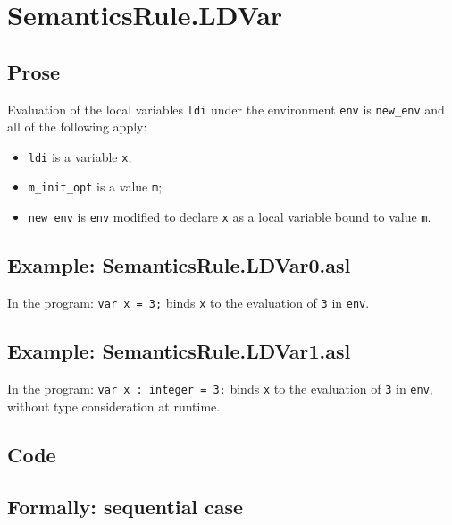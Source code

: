 \documentclass{book}
\begin{document}
\section{SemanticsRule.LDVar \label{sec:SemanticsRule.LDVar}}

    \subsection{Prose}
Evaluation of the local variables \texttt{ldi} under the environment
\texttt{env} is \texttt{new\_env} and all of the following apply:
    \begin{itemize}
    \item \texttt{ldi} is a variable \texttt{x};
    \item \texttt{m\_init\_opt} is a value \texttt{m};
    \item \texttt{new\_env} is \texttt{env} modified to declare \texttt{x} as a
local variable bound to value \texttt{m}.
    \end{itemize}

    \subsection{Example: SemanticsRule.LDVar0.asl}
    In the program:
    \texttt{var x = 3;} binds \texttt{x} to the evaluation of \texttt{3} in \texttt{env}.

    \subsection{Example: SemanticsRule.LDVar1.asl}
    In the program:
    \texttt{var x : integer = 3;} binds \texttt{x} to the evaluation of
\texttt{3} in \texttt{env}, without type consideration at runtime.

  \subsection{Code}

  \subsection{Formally: sequential case}
  \begin{align}
  \end{align} 
\end{document}
